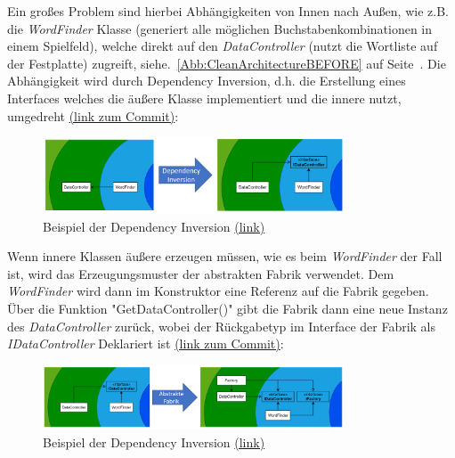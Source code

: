 Ein großes Problem sind hierbei Abhängigkeiten von Innen nach Außen, wie z.B. die \textit{WordFinder} Klasse (generiert alle möglichen Buchstabenkombinationen in einem Spielfeld), welche direkt auf den \textit{DataController} (nutzt die Wortliste auf der Festplatte) zugreift, siehe.~\ref{Abb:CleanArchitectureBEFORE} auf Seite~\pageref{Abb:CleanArchitectureBEFORE}. Die Abhängigkeit wird durch Dependency Inversion, d.h. die Erstellung eines Interfaces welches die äußere Klasse implementiert und die innere nutzt, umgedreht \href{https://github.com/EinToni/Wortfinder/commit/586681478211a26abc661239ecc2c297ef77041e}{(link zum Commit)}:
\newpage
\begin{figure}[!ht]
  \centering
  \includegraphics[width=0.8\textwidth]{Bilder/DependencyInversion.PNG}
  \caption[Beispiel der Dependency Inversion]{Beispiel der Dependency Inversion \href{https://github.com/EinToni/WortfinderDoku/blob/main/Bilder/DependencyInversion.png}{(link)}}
  \label{Abb:DependencyInversion}
\end{figure}

Wenn innere Klassen äußere erzeugen müssen, wie es beim \textit{WordFinder} der Fall ist, wird das Erzeugungsmuster der abstrakten Fabrik verwendet. Dem \textit{WordFinder} wird dann im Konstruktor eine Referenz auf die Fabrik gegeben. Über die Funktion "GetDataController()" gibt die Fabrik dann eine neue Instanz des \textit{DataController} zurück, wobei der Rückgabetyp im Interface der Fabrik als \textit{IDataController} Deklariert ist \href{https://github.com/EinToni/Wortfinder/commit/26148d6a7ae6784b935a260371672fe16f8bbfa0}{(link zum Commit)}:

\begin{figure}[!ht]
  \centering
  \includegraphics[width=0.8\textwidth]{Bilder/AbstrakteFabrik.PNG}
  \caption[Beispiel der Dependency Inversion]{Beispiel der Dependency Inversion \href{https://github.com/EinToni/WortfinderDoku/blob/main/Bilder/AbstrakteFabrik.png}{(link)}}
  \label{Abb:AbstrakteFabrik}
\end{figure}

